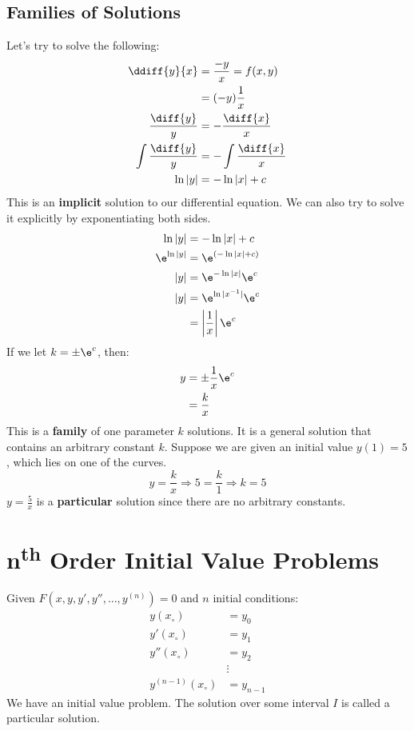 \documentclass{math}
\begin{document}
\subsection*{Families of Solutions}
Let's try to solve the following:
\begin{align*}
  \ddiff{y}{x} &= \frac{-y}{x} = f(x,y) \\
  &= (-y)\frac{1}{x} \\
  \frac{\diff{y}}{y} &= -\frac{\diff{x}}{x} \\
  \int\frac{\diff{y}}{y} &= -\int\frac{\diff{x}}{x} \\
  \ln|y| &= -\ln|x|+c
\end{align*}
This is an \textbf{implicit} solution to our differential equation. We can also
try to solve it explicitly by exponentiating both sides.
\begin{align*}
  \ln|y| &= -\ln|x|+c \\
  \e^{\ln|y|} &= \e^{(-\ln|x|+c)} \\
  |y| &= \e^{-\ln|x|}\e^c \\
  |y| &= \e^{\ln|x^{-1}|}\e^c \\
  &= \left|\frac{1}{x}\right|\e^c
\end{align*}
If we let \( k = \pm\e^c \), then:
\begin{align*}
  y &= \pm\frac{1}{x}\e^c \\
  &= \frac{k}{x}
\end{align*}
This is a \textbf{family} of one parameter \( k \) solutions. It is a general
solution that contains an arbitrary constant \( k \). Suppose we are given an
initial value \( y(1) = 5 \), which lies on one of the curves.
\[ y = \frac{k}{x} \Longrightarrow 5 = \frac{k}{1} \Longrightarrow k = 5 \]
\( y = \frac{5}{x} \) is a \textbf{particular} solution since there are no
arbitrary constants.

\clearpage
\section*{n\textsuperscript{th} Order Initial Value Problems}
Given \( F(x,y,y',y'',\dots,y^{(n)}) = 0 \) and \( n \) initial conditions:
\begin{align*}
  y(x_{\circ}) &= y_0 \\
  y'(x_{\circ}) &= y_1 \\
  y''(x_{\circ}) &= y_2 \\
  & \vdots \\
  y^{(n-1)}(x_{\circ}) &= y_{n-1}
\end{align*}
We have an initial value problem. The solution over some interval \( I \) is
called a particular solution.
\end{document}
